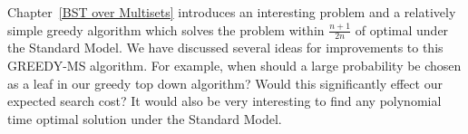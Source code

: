 \documentclass[letterpaper,12pt,titlepage,oneside,final]{book}
\theoremstyle{plain}
\let\origdoublepage\cleardoublepage
\newcommand{\clearemptydoublepage}{%
  \clearpage{\pagestyle{empty}\origdoublepage}}
\let\cleardoublepage\clearemptydoublepage
\begin{document}
Chapter~\ref{BST over Multisets} introduces an interesting problem and a relatively simple greedy algorithm which solves the problem within $\frac{n+1}{2n}$ of optimal under the Standard Model. We have discussed several ideas for improvements to this GREEDY-MS algorithm. For example, when should a large probability be chosen as a leaf in our greedy top down algorithm? Would this significantly effect our expected search cost? It would also be very interesting to find any polynomial time optimal solution under the Standard Model.








\cleardoublepage %
\renewcommand*{\bibname}{References}




\nocite{*}
\end{document}
